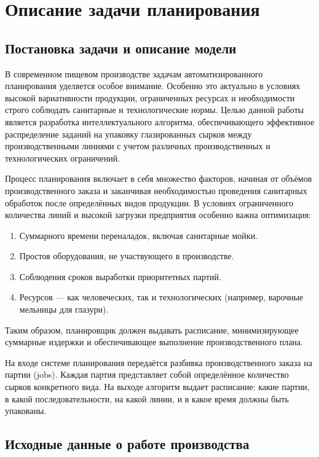 \chapter{Описание задачи планирования}
\label{ch:chapter2}

\section{Постановка задачи и описание модели}

В современном пищевом производстве задачам автоматизированного планирования уделяется особое внимание. Особенно это актуально в условиях высокой вариативности продукции, ограниченных ресурсах и необходимости строго соблюдать санитарные и технологические нормы. Целью данной работы является разработка интеллектуального алгоритма, обеспечивающего эффективное распределение заданий на упаковку глазированных сырков между производственными линиями с учетом различных производственных и технологических ограничений.

Процесс планирования включает в себя множество факторов, начиная от объёмов производственного заказа и заканчивая необходимостью проведения санитарных обработок после определённых видов продукции. В условиях ограниченного количества линий и высокой загрузки предприятия особенно важна оптимизация:

\begin{enumerate}
	\item Суммарного времени переналадок, включая санитарные мойки.
	\item Простоя оборудования, не участвующего в производстве.
	\item Соблюдения сроков выработки приоритетных партий.
	\item Ресурсов — как человеческих, так и технологических (например, варочные мельницы для глазури).
\end{enumerate}

Таким образом, планировщик должен выдавать расписание, минимизирующее суммарные издержки и обеспечивающее выполнение производственного плана.

На входе системе планирования передаётся разбивка производственного заказа на партии (jobs). Каждая партия представляет собой определённое количество сырков конкретного вида. На выходе алгоритм выдает расписание: какие партии, в какой последовательности, на какой линии, и в какое время должны быть упакованы.

\section{Исходные данные о работе производства}

